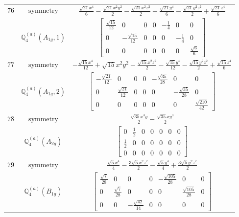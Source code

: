 \documentclass[fleqn,8pt,landscape]{jsarticle}
\begin{document}
\begin{longtable}{ccc}
$ 76 $ & $ \text{symmetry} $ & $ \frac{\sqrt{21} x^{4}}{6} - \frac{\sqrt{21} x^{2} y^{2}}{2} - \frac{\sqrt{21} x^{2} z^{2}}{2} + \frac{\sqrt{21} y^{4}}{6} - \frac{\sqrt{21} y^{2} z^{2}}{2} + \frac{\sqrt{21} z^{4}}{6} $ \\
$  $ & $ \mathbb{Q}_{4}^{(a)}(A_{1g},1) $ & $ \begin{bmatrix} \frac{\sqrt{15}}{12} & 0 & 0 & 0 & - \frac{1}{4} & 0 & 0 \\ 0 & - \frac{\sqrt{15}}{12} & 0 & 0 & 0 & - \frac{1}{4} & 0 \\ 0 & 0 & 0 & 0 & 0 & 0 & \frac{\sqrt{6}}{6} \end{bmatrix} $ \\ \hline
$ 77 $ & $ \text{symmetry} $ & $ - \frac{\sqrt{15} x^{4}}{12} + \sqrt{15} x^{2} y^{2} - \frac{\sqrt{15} x^{2} z^{2}}{2} - \frac{\sqrt{15} y^{4}}{12} - \frac{\sqrt{15} y^{2} z^{2}}{2} + \frac{\sqrt{15} z^{4}}{6} $ \\
$  $ & $ \mathbb{Q}_{4}^{(a)}(A_{1g},2) $ & $ \begin{bmatrix} - \frac{\sqrt{21}}{12} & 0 & 0 & 0 & - \frac{\sqrt{35}}{28} & 0 & 0 \\ 0 & \frac{\sqrt{21}}{12} & 0 & 0 & 0 & - \frac{\sqrt{35}}{28} & 0 \\ 0 & 0 & 0 & 0 & 0 & 0 & \frac{\sqrt{210}}{42} \end{bmatrix} $ \\ \hline
$ 78 $ & $ \text{symmetry} $ & $ \frac{\sqrt{35} x^{3} y}{2} - \frac{\sqrt{35} x y^{3}}{2} $ \\
$  $ & $ \mathbb{Q}_{4}^{(a)}(A_{2g}) $ & $ \begin{bmatrix} 0 & \frac{1}{2} & 0 & 0 & 0 & 0 & 0 \\ \frac{1}{2} & 0 & 0 & 0 & 0 & 0 & 0 \\ 0 & 0 & 0 & 0 & 0 & 0 & 0 \end{bmatrix} $ \\ \hline
$ 79 $ & $ \text{symmetry} $ & $ \frac{\sqrt{5} x^{4}}{4} - \frac{3 \sqrt{5} x^{2} z^{2}}{2} - \frac{\sqrt{5} y^{4}}{4} + \frac{3 \sqrt{5} y^{2} z^{2}}{2} $ \\
$  $ & $ \mathbb{Q}_{4}^{(a)}(B_{1g}) $ & $ \begin{bmatrix} \frac{\sqrt{7}}{28} & 0 & 0 & 0 & - \frac{\sqrt{105}}{28} & 0 & 0 \\ 0 & \frac{\sqrt{7}}{28} & 0 & 0 & 0 & \frac{\sqrt{105}}{28} & 0 \\ 0 & 0 & - \frac{\sqrt{42}}{14} & 0 & 0 & 0 & 0 \end{bmatrix} $ \\ \hline

\end{longtable}
\end{document}
